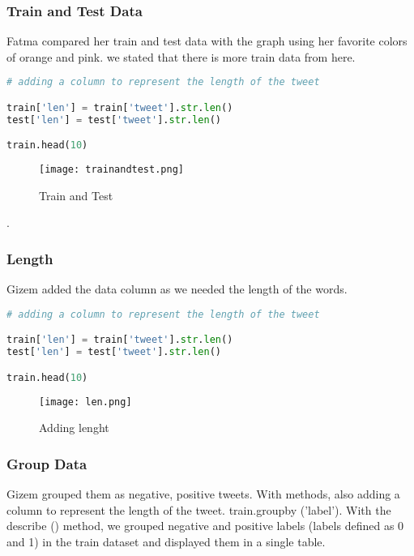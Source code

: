 \documentclass[onecolumn]{article}
\begin{document}
\subsubsection{Train and Test Data}

Fatma  compared her train and test data with the graph using her favorite colors of orange and pink. we stated that there is more train data from here.

\begin{lstlisting}[language=Python, caption= label 0]
# adding a column to represent the length of the tweet

train['len'] = train['tweet'].str.len()
test['len'] = test['tweet'].str.len()

train.head(10)
\end{lstlisting}


\begin{figure}[ht!]
\centering
\texttt{[image: trainandtest.png]}
\caption{Train and Test \label{}}
\end{figure}
.\\
\subsubsection{Length}
Gizem  added the data column as we needed the length of the words.

\begin{lstlisting}[language=Python, caption= label 0]
# adding a column to represent the length of the tweet

train['len'] = train['tweet'].str.len()
test['len'] = test['tweet'].str.len()

train.head(10)
\end{lstlisting}


\begin{figure}[ht!]
\centering
\texttt{[image: len.png]}
\caption{Adding lenght \label{}}
\end{figure}


\subsubsection{Group Data}

Gizem grouped them as negative, positive tweets. With methods, also adding a column to represent the length of the tweet.
train.groupby ('label'). With the describe () method, we grouped negative and positive labels (labels defined as 0 and 1) in the train dataset and displayed them in a single table.
\end{document}
